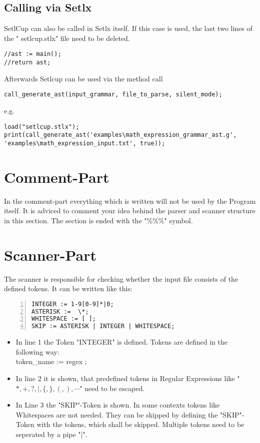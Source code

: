 \subsection{Calling via Setlx}
SetlCup can also be called in Setlx itself. If this case is used, the last two lines of the " setlcup.stlx" file need to be deleted.
\begin{lstlisting}[frame=single,basicstyle=\footnotesize ,breaklines=true]
//ast := main();
//return ast;
\end{lstlisting}
Afterwards Setlcup can be used via the method call
\begin{lstlisting}[frame=single,basicstyle=\footnotesize ,breaklines=true]
call_generate_ast(input_grammar, file_to_parse, silent_mode);
\end{lstlisting}
e.g.
\begin{lstlisting}[frame=single,basicstyle=\footnotesize ,breaklines=true]
load("setlcup.stlx");
print(call_generate_ast('examples\math_expression_grammar_ast.g', 'examples\math_expression_input.txt', true));
\end{lstlisting}
\section{Comment-Part}
In the comment-part everything which is written will not be used by the Program itself. It is adviced to comment your idea behind the parser and scanner structure in this section.
The section is ended with the "\%\%\%" symbol.

\section{Scanner-Part}
The scanner is responsible for checking whether the input file consists of the defined tokens. It can be written like this:
\begin{lstlisting}[frame=single,numbers=left,basicstyle=\footnotesize]
INTEGER := 1-9[0-9]*|0;
ASTERISK :=  \*;
WHITESPACE := [ ];
SKIP := ASTERISK | INTEGER | WHITESPACE;
\end{lstlisting}
\begin{itemize}
	\item In line 1 the Token "INTEGER" is defined. Tokens are defined in the following way:\\
					token\_name := regex ;
	\item In line 2 it is shown, that predefined tokens in Regular Expressions like "$*,+,?,|,\{,\},(,),\cdots$" need to be escaped.
	\item In Line 3 the "SKIP"-Token is shown. In some contexts tokens like Whitespaces are not needed. They can be skipped by defining the "SKIP"-Token with the tokens, which shall be skipped. Multiple tokens need to be seperated by a pipe "|".
\end{itemize}

